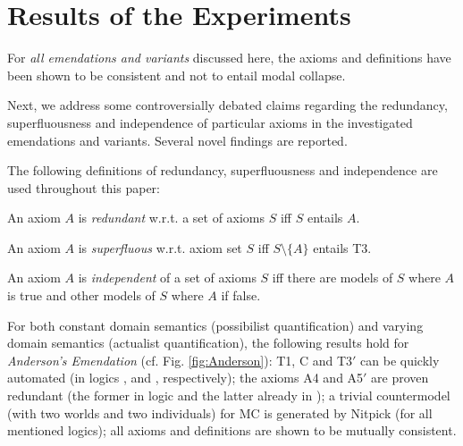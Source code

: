 \documentclass{birkjour}
\theoremstyle{definition}
\theoremstyle{remark}
\numberwithin{equation}{section}
\begin{document}
\section{Results of the Experiments}
For \emph{all emendations and variants} discussed here, the axioms and
definitions have been shown to be consistent and not to entail modal
collapse. 

Next, we address some controversially debated claims regarding the redundancy,
superfluousness and independence of particular axioms in the
investigated emendations and variants. Several novel findings are
reported.

The following definitions of redundancy, superfluousness and independence are used throughout this paper:

\begin{definition}
An axiom $A$ is \emph{redundant} w.r.t. a set of axioms $S$ iff $S$ entails $A$. 
\end{definition}

\begin{definition}
An axiom $A$ is \emph{superfluous} w.r.t. axiom set $S$ iff $S \setminus \{ A \}$ entails T3.
\end{definition}

\begin{definition}
  An axiom $A$ is \emph{independent} of a set of axioms $S$ iff
  there are models of $S$ where $A$ is true and other models of
  $S$ where $A$ if false.
\end{definition}


For both {constant domain semantics} (possibilist quantification) and {varying domain
semantics} (actualist quantification), the following results hold for \emph{Anderson's
Emendation} (cf. Fig. \ref{fig:Anderson}): T1, C
and T3$'$ can be quickly automated (in logics \K, \K and \KB,
respectively); the axioms A4 and A5$'$ are proven redundant (the former in logic \KFourB and the latter
already in \K); a trivial countermodel (with two worlds and  two
individuals) for MC is generated by Nitpick (for all mentioned
logics); all axioms and definitions are shown to be mutually
consistent.
\end{document}
